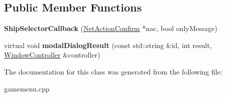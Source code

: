 \subsection*{Public Member Functions}
\begin{DoxyCompactItemize}
\item 
{\bfseries Ship\+Selector\+Callback} (\hyperlink{classNetActionConfirm}{Net\+Action\+Confirm} $\ast$nac, bool only\+Message)\hypertarget{classShipSelectorCallback_a01f1482a4b361ace6b238bffa59a1240}{}\label{classShipSelectorCallback_a01f1482a4b361ace6b238bffa59a1240}

\item 
virtual void {\bfseries modal\+Dialog\+Result} (const std\+::string \&id, int result, \hyperlink{classWindowController}{Window\+Controller} \&controller)\hypertarget{classShipSelectorCallback_ac61ba2b6577e0fa09cb9677c1ed1ec20}{}\label{classShipSelectorCallback_ac61ba2b6577e0fa09cb9677c1ed1ec20}

\end{DoxyCompactItemize}


The documentation for this class was generated from the following file\+:\begin{DoxyCompactItemize}
\item 
gamemenu.\+cpp\end{DoxyCompactItemize}
